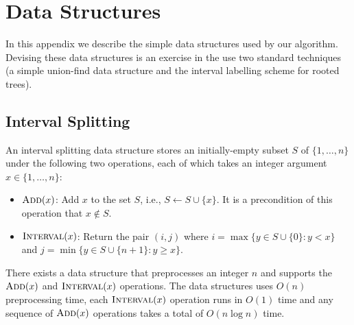 \documentclass[kpfonts]{patmorin}
\let\ge\geqslant
\begin{document}




\appendix

\section{Data Structures}

In this appendix we describe the simple data structures used by our algorithm. Devising these data structures is an exercise in the use two standard techniques (a simple union-find data structure and the interval labelling scheme for rooted trees).

\subsection{Interval Splitting}

An interval splitting data structure stores an initially-empty subset $S$ of $\{1,\ldots,n\}$ under the following two operations, each of which takes an integer argument $x\in\{1,\ldots,n\}$:
\begin{itemize}
    \item $\textsc{Add}(x)$: Add $x$ to the set $S$, i.e., $S\gets S\cup \{x\}$.  It is a precondition of this operation that $x\not\in S$.
    \item $\textsc{Interval}(x)$: Return the pair $(i,j)$ where $i=\max\{y\in S\cup\{0\}:y<x\}$ and $j=\min\{y\in S\cup\{n+1\}:y\ge x\}$.
\end{itemize}

\begin{lem}
    There exists a data structure that preprocesses an integer $n$ and supports the $\textsc{Add}(x)$ and $\textsc{Interval}(x)$ operations.  The data structures uses $O(n)$ preprocessing time, each $\textsc{Interval}(x)$ operation runs in $O(1)$ time and any sequence of $\textsc{Add}(x)$ operations takes a total of $O(n\log n)$ time.
\end{lem}
\end{document}
